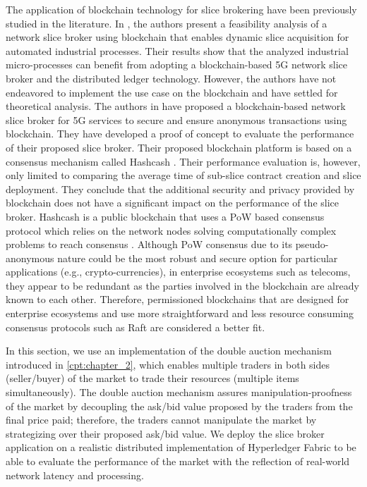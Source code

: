 The application of blockchain technology for slice brokering have been previously studied in the literature.
In \cite{8368983}, the authors present a feasibility analysis of a network slice broker using blockchain that enables dynamic slice acquisition for automated industrial processes. Their results show that the analyzed industrial micro-processes can benefit from adopting a blockchain-based \ac{5G} network slice broker and the distributed ledger technology. However, the authors have not endeavored to implement the use case on the blockchain and have settled for theoretical analysis. The authors in \cite{8707070} have proposed a blockchain-based network slice broker for 5G services to secure and ensure anonymous transactions using blockchain. They have developed a proof of concept to evaluate the performance of their proposed slice broker. Their proposed blockchain platform is based on a consensus mechanism called Hashcash \cite{hashcash}. Their performance evaluation is, however, only limited to comparing the average time of sub-slice contract creation and slice deployment. They conclude that the additional security and privacy provided by blockchain does not have a significant impact on the performance of the slice broker. Hashcash is a public blockchain that uses a \ac{PoW} based consensus protocol which relies on the network nodes solving computationally complex problems to reach consensus \cite{8716424}. Although \ac{PoW} consensus due to its pseudo-anonymous nature could be the most robust and secure option for particular applications (e.g., crypto-currencies), in enterprise ecosystems such as telecoms, they appear to be redundant as the parties involved in the blockchain are already known to each other. Therefore, permissioned blockchains that are designed for enterprise ecosystems and use more straightforward and less resource consuming consensus protocols such as Raft \cite{Ongaro:raft} are considered a better fit.



In this section, we use an implementation of the double auction mechanism introduced in \autoref{cpt:chapter_2}, which enables multiple traders in both sides (seller/buyer) of the market to trade their resources (multiple items simultaneously). The double auction mechanism assures manipulation-proofness of the market by decoupling the ask/bid value proposed by the traders from the final price paid; therefore, the traders cannot manipulate the market by strategizing over their proposed ask/bid value. %
We deploy the slice broker application on a realistic distributed implementation of Hyperledger Fabric to be able to evaluate the performance of the market with the reflection of real-world network latency and processing. 

